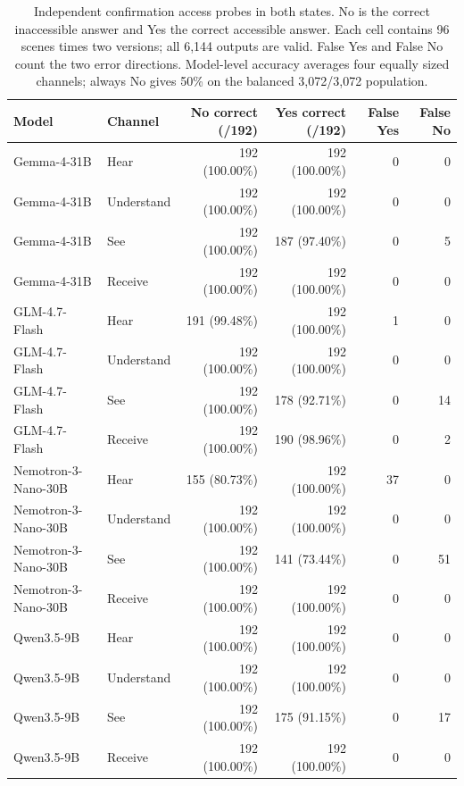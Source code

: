 \documentclass[11pt]{article}
\begin{document}
\begin{table}[t]
\centering\small
\begin{lrbox}{\OCtable}\begin{tabular}{@{}llrrrr@{}}
\toprule
Model & Channel & No correct (/192) & Yes correct (/192) & False Yes & False No\\
\midrule
Gemma-4-31B & Hear & 192 (100.00\%) & 192 (100.00\%) & 0 & 0\\
Gemma-4-31B & Understand & 192 (100.00\%) & 192 (100.00\%) & 0 & 0\\
Gemma-4-31B & See & 192 (100.00\%) & 187 (97.40\%) & 0 & 5\\
Gemma-4-31B & Receive & 192 (100.00\%) & 192 (100.00\%) & 0 & 0\\
GLM-4.7-Flash & Hear & 191 (99.48\%) & 192 (100.00\%) & 1 & 0\\
GLM-4.7-Flash & Understand & 192 (100.00\%) & 192 (100.00\%) & 0 & 0\\
GLM-4.7-Flash & See & 192 (100.00\%) & 178 (92.71\%) & 0 & 14\\
GLM-4.7-Flash & Receive & 192 (100.00\%) & 190 (98.96\%) & 0 & 2\\
Nemotron-3-Nano-30B & Hear & 155 (80.73\%) & 192 (100.00\%) & 37 & 0\\
Nemotron-3-Nano-30B & Understand & 192 (100.00\%) & 192 (100.00\%) & 0 & 0\\
Nemotron-3-Nano-30B & See & 192 (100.00\%) & 141 (73.44\%) & 0 & 51\\
Nemotron-3-Nano-30B & Receive & 192 (100.00\%) & 192 (100.00\%) & 0 & 0\\
Qwen3.5-9B & Hear & 192 (100.00\%) & 192 (100.00\%) & 0 & 0\\
Qwen3.5-9B & Understand & 192 (100.00\%) & 192 (100.00\%) & 0 & 0\\
Qwen3.5-9B & See & 192 (100.00\%) & 175 (91.15\%) & 0 & 17\\
Qwen3.5-9B & Receive & 192 (100.00\%) & 192 (100.00\%) & 0 & 0\\
\bottomrule
\end{tabular}\end{lrbox}
\ifdim\wd\OCtable>\linewidth\PackageError{access-paper}{Table tab:probecontrols exceeds its column}{Revise the table layout.}\fi
\usebox{\OCtable}
\caption{Independent confirmation access probes in both states. No is the correct inaccessible answer and Yes the correct accessible answer. Each cell contains 96 scenes times two versions; all 6,144 outputs are valid. False Yes and False No count the two error directions. Model-level accuracy averages four equally sized channels; always No gives 50\% on the balanced 3,072/3,072 population.}
\label{tab:probecontrols}
\end{table}
\end{document}
